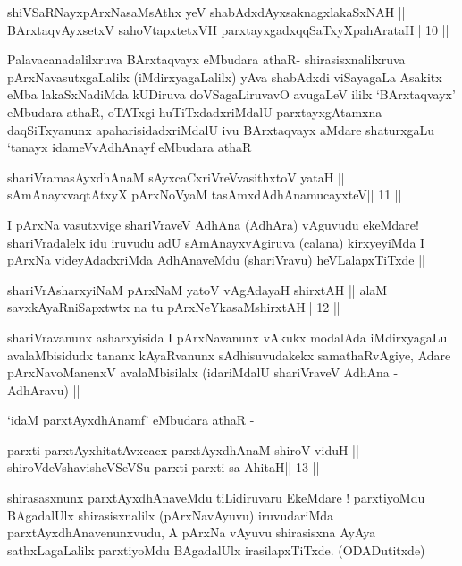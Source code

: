 \begin{shl}
shiVSaRNayxpArxNasaMsAthx yeV shabAdxdAyxsaknagxlakaSxNAH ||
BArxtaqvAyxsetxV sahoVtapxtetxVH parxtayxgadxqqSaTxyXpahArataH\hfill || 10 ||
\end{shl}

\begin{artha}
Palavacanadalilxruva BArxtaqvayx eMbudara athaR- shirasisxnalilxruva
pArxNavasutxgaLalilx (iMdirxyagaLalilx) yAva shabAdxdi viSayagaLa
Asakitx eMba lakaSxNadiMda kUDiruva doVSagaLiruvavO avugaLeV ililx
`BArxtaqvayx' eMbudara athaR, oTATxgi huTiTxdadxriMdalU
parxtayxgAtamxna daqSiTxyanunx apaharisidadxriMdalU ivu BArxtaqvayx
aMdare shaturxgaLu `tanayx idameVvA\s\s dhAnayf eMbudara athaR
\end{artha}

\begin{shl}
shariVramasAyx\s\s dhAnaM sAyxcaCxriVreV\s vasithxtoV yataH ||
sAmAnayxvaqtAtxyX pArxNoV\s yaM tasAmxdAdhAnamucayxteV\hfill || 11 ||
\end{shl}

\begin{artha}
I pArxNa vasutxvige shariVraveV AdhAna (AdhAra) vAguvudu ekeMdare!
shariVradalelx idu iruvudu adU sAmAnayxvAgiruva (calana) kirxyeyiMda I
pArxNa videyAdadxriMda AdhAnaveMdu (shariVravu) heVLalapxTiTxde ||
\end{artha}

\begin{shl}
shariVrAsharxyiNaM pArxNaM yatoV vAgAdayaH shirxtAH ||
alaM savxkAyaRniSapxtwtx na tu pArxNeYkasaMshirxtAH\hfill || 12 ||
\end{shl}

\begin{artha}
shariVravanunx asharxyisida I pArxNavanunx vAkukx modalAda
iMdirxyagaLu avalaMbisidudx tananx kAyaRvanunx sAdhisuvudakekx
samathaRvAgiye, Adare pArxNavoManenxV avalaMbisilalx (idariMdalU
shariVraveV AdhAna - AdhAravu) ||

`idaM parxtAyxdhAnamf' eMbudara athaR -
\end{artha}

\begin{shl}
parxti parxtAyxhitatAvxcacx parxtAyxdhAnaM shiroV viduH ||
shiroVdeVshavisheVSeVSu parxti parxti sa AhitaH\hfill || 13 ||
\end{shl}

\begin{artha}
shirasasxnunx parxtAyxdhAnaveMdu tiLidiruvaru EkeMdare ! parxtiyoMdu
BAgadalUlx shirasisxnalilx (pArxNavAyuvu) iruvudariMda
parxtAyxdhAnavenunxvudu, A pArxNa vAyuvu shirasisxna AyAya
sathxLagaLalilx parxtiyoMdu BAgadalUlx irasilapxTiTxde. (ODADutitxde)
\end{artha}


